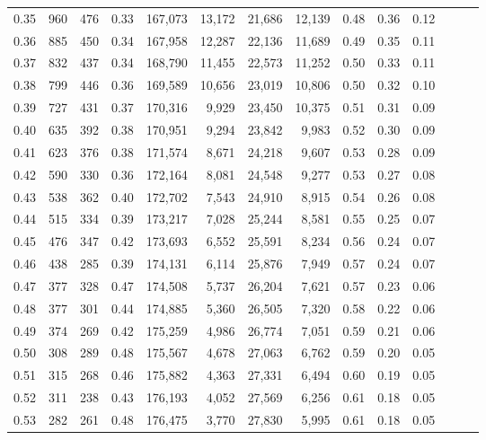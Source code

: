 \begin{tabular}{rrrrrrrrrrrrrr}
0.35 &     960 &  476 &  0.33 &  167,073 &   13,172 &  21,686 &  12,139 &  0.48 &  0.36 &      0.12 \\
0.36 &     885 &  450 &  0.34 &  167,958 &   12,287 &  22,136 &  11,689 &  0.49 &  0.35 &      0.11 \\
0.37 &     832 &  437 &  0.34 &  168,790 &   11,455 &  22,573 &  11,252 &  0.50 &  0.33 &      0.11 \\
0.38 &     799 &  446 &  0.36 &  169,589 &   10,656 &  23,019 &  10,806 &  0.50 &  0.32 &      0.10 \\
0.39 &     727 &  431 &  0.37 &  170,316 &    9,929 &  23,450 &  10,375 &  0.51 &  0.31 &      0.09 \\
0.40 &     635 &  392 &  0.38 &  170,951 &    9,294 &  23,842 &   9,983 &  0.52 &  0.30 &      0.09 \\
0.41 &     623 &  376 &  0.38 &  171,574 &    8,671 &  24,218 &   9,607 &  0.53 &  0.28 &      0.09 \\
0.42 &     590 &  330 &  0.36 &  172,164 &    8,081 &  24,548 &   9,277 &  0.53 &  0.27 &      0.08 \\
0.43 &     538 &  362 &  0.40 &  172,702 &    7,543 &  24,910 &   8,915 &  0.54 &  0.26 &      0.08 \\
0.44 &     515 &  334 &  0.39 &  173,217 &    7,028 &  25,244 &   8,581 &  0.55 &  0.25 &      0.07 \\
0.45 &     476 &  347 &  0.42 &  173,693 &    6,552 &  25,591 &   8,234 &  0.56 &  0.24 &      0.07 \\
0.46 &     438 &  285 &  0.39 &  174,131 &    6,114 &  25,876 &   7,949 &  0.57 &  0.24 &      0.07 \\
0.47 &     377 &  328 &  0.47 &  174,508 &    5,737 &  26,204 &   7,621 &  0.57 &  0.23 &      0.06 \\
0.48 &     377 &  301 &  0.44 &  174,885 &    5,360 &  26,505 &   7,320 &  0.58 &  0.22 &      0.06 \\
0.49 &     374 &  269 &  0.42 &  175,259 &    4,986 &  26,774 &   7,051 &  0.59 &  0.21 &      0.06 \\
0.50 &     308 &  289 &  0.48 &  175,567 &    4,678 &  27,063 &   6,762 &  0.59 &  0.20 &      0.05 \\
0.51 &     315 &  268 &  0.46 &  175,882 &    4,363 &  27,331 &   6,494 &  0.60 &  0.19 &      0.05 \\
0.52 &     311 &  238 &  0.43 &  176,193 &    4,052 &  27,569 &   6,256 &  0.61 &  0.18 &      0.05 \\
0.53 &     282 &  261 &  0.48 &  176,475 &    3,770 &  27,830 &   5,995 &  0.61 &  0.18 &      0.05 \\

\end{tabular}
